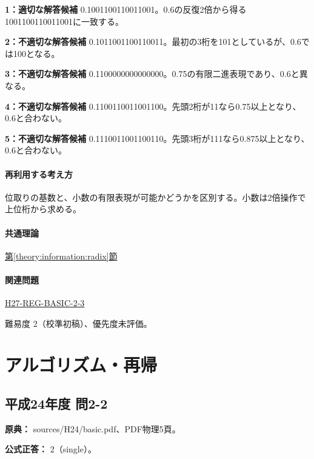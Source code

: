 \noindent\textbf{1：適切な解答候補} 0.1001100110011001。0.6の反復2倍から得る1001100110011001に一致する。\par

\noindent\textbf{2：不適切な解答候補} 0.1011001100110011。最初の3桁を101としているが、0.6では100となる。\par

\noindent\textbf{3：不適切な解答候補} 0.1100000000000000。0.75の有限二進表現であり、0.6と異なる。\par

\noindent\textbf{4：不適切な解答候補} 0.1100110011001100。先頭2桁が11なら0.75以上となり、0.6と合わない。\par

\noindent\textbf{5：不適切な解答候補} 0.1110011001100110。先頭3桁が111なら0.875以上となり、0.6と合わない。\par

\paragraph{再利用する考え方} 位取りの基数と、小数の有限表現が可能かどうかを区別する。小数は2倍操作で上位桁から求める。

\paragraph{共通理論} \hyperref[theory:information:radix]{第\ref*{theory:information:radix}節}

\paragraph{関連問題} \hyperref[q:h27-reg-basic-2-3]{H27-REG-BASIC-2-3}

\par 難易度 2（校準初稿）、優先度未評価。

\section{アルゴリズム・再帰}

\subsection{平成24年度 問2-2}
\label{q:h24-reg-basic-2-2}

\noindent\textbf{原典：} sources/H24/basic.pdf、PDF物理5頁。

\textbf{公式正答：} 2（single）。

